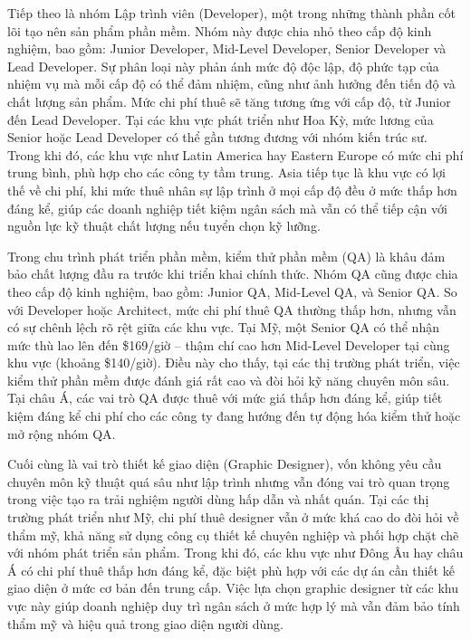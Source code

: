     \begin{flushleft}
      \hspace*{0.8cm}Tiếp theo là nhóm Lập trình viên (Developer), một trong những thành phần cốt lõi tạo nên sản phẩm phần mềm. Nhóm này được chia nhỏ theo cấp độ kinh nghiệm, bao gồm: Junior Developer, Mid-Level Developer, Senior Developer và Lead Developer. Sự phân loại này phản ánh mức độ độc lập, độ phức tạp của nhiệm vụ mà mỗi cấp độ có thể đảm nhiệm, cũng như ảnh hưởng đến tiến độ và chất lượng sản phẩm. Mức chi phí thuê sẽ tăng tương ứng với cấp độ, từ Junior đến Lead Developer. Tại các khu vực phát triển như Hoa Kỳ, mức lương của Senior hoặc Lead Developer có thể gần tương đương với nhóm kiến trúc sư. Trong khi đó, các khu vực như Latin America hay Eastern Europe có mức chi phí trung bình, phù hợp cho các công ty tầm trung. Asia tiếp tục là khu vực có lợi thế về chi phí, khi mức thuê nhân sự lập trình ở mọi cấp độ đều ở mức thấp hơn đáng kể, giúp các doanh nghiệp tiết kiệm ngân sách mà vẫn có thể tiếp cận với nguồn lực kỹ thuật chất lượng nếu tuyển chọn kỹ lưỡng.
    \end{flushleft}

    \begin{flushleft}
      \hspace*{0.8cm}Trong chu trình phát triển phần mềm, kiểm thử phần mềm (QA) là khâu đảm bảo chất lượng đầu ra trước khi triển khai chính thức. Nhóm QA cũng được chia theo cấp độ kinh nghiệm, bao gồm: Junior QA, Mid-Level QA, và Senior QA. So với Developer hoặc Architect, mức chi phí thuê QA thường thấp hơn, nhưng vẫn có sự chênh lệch rõ rệt giữa các khu vực. Tại Mỹ, một Senior QA có thể nhận mức thù lao lên đến \$169/giờ – thậm chí cao hơn Mid-Level Developer tại cùng khu vực (khoảng \$140/giờ). Điều này cho thấy, tại các thị trường phát triển, việc kiểm thử phần mềm được đánh giá rất cao và đòi hỏi kỹ năng chuyên môn sâu. Tại châu Á, các vai trò QA được thuê với mức giá thấp hơn đáng kể, giúp tiết kiệm đáng kể chi phí cho các công ty đang hướng đến tự động hóa kiểm thử hoặc mở rộng nhóm QA.
    \end{flushleft}

    \begin{flushleft}
      \hspace*{0.8cm}Cuối cùng là vai trò thiết kế giao diện (Graphic Designer), vốn không yêu cầu chuyên môn kỹ thuật quá sâu như lập trình nhưng vẫn đóng vai trò quan trọng trong việc tạo ra trải nghiệm người dùng hấp dẫn và nhất quán. Tại các thị trường phát triển như Mỹ, chi phí thuê designer vẫn ở mức khá cao do đòi hỏi về thẩm mỹ, khả năng sử dụng công cụ thiết kế chuyên nghiệp và phối hợp chặt chẽ với nhóm phát triển sản phẩm. Trong khi đó, các khu vực như Đông Âu hay châu Á có chi phí thuê thấp hơn đáng kể, đặc biệt phù hợp với các dự án cần thiết kế giao diện ở mức cơ bản đến trung cấp. Việc lựa chọn graphic designer từ các khu vực này giúp doanh nghiệp duy trì ngân sách ở mức hợp lý mà vẫn đảm bảo tính thẩm mỹ và hiệu quả trong giao diện người dùng.
    \end{flushleft}

